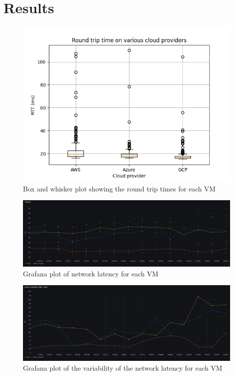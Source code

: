 \documentclass[11pt,a4paper]{article}
\begin{document}
\section*{Results}

\begin{figure}
\includegraphics[width=\textwidth]{boxplot.png}
\caption{Box and whisker plot showing the round trip times for each VM}
\label{boxplot}
\end{figure}

\begin{figure}
\includegraphics[width=\textwidth]{Latency.jpeg}
\caption{Grafana plot of network latency for each VM}
\label{latency}
\end{figure}

\begin{figure}
\includegraphics[width=\textwidth]{LatencyVar.jpeg}
\caption{Grafana plot of the variability of the network latency for each VM}
\label{latencyvar}
\end{figure}
\end{document}
